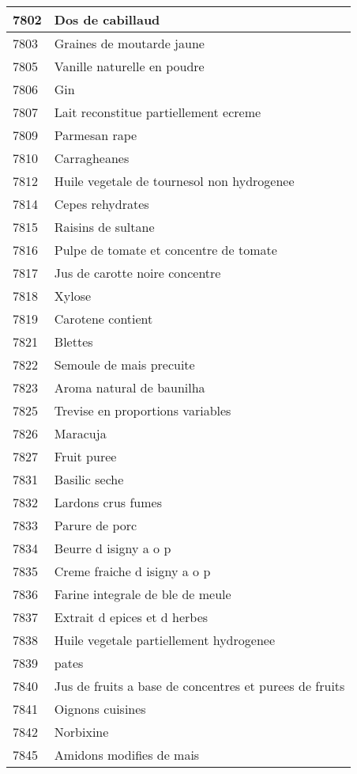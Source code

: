 \begin{longtable}{|l|l|}
7802 & Dos de cabillaud \\ \hline 
7803 & Graines de moutarde jaune \\ \hline 
7805 & Vanille naturelle en poudre \\ \hline 
7806 & Gin \\ \hline 
7807 & Lait reconstitue partiellement ecreme \\ \hline 
7809 & Parmesan rape \\ \hline 
7810 & Carragheanes \\ \hline 
7812 & Huile vegetale de tournesol non hydrogenee \\ \hline 
7814 & Cepes rehydrates \\ \hline 
7815 & Raisins de sultane \\ \hline 
7816 & Pulpe de tomate et concentre de tomate \\ \hline 
7817 & Jus de carotte noire concentre \\ \hline 
7818 & Xylose \\ \hline 
7819 & Carotene contient \\ \hline 
7821 & Blettes \\ \hline 
7822 & Semoule de mais precuite \\ \hline 
7823 & Aroma natural de baunilha \\ \hline 
7825 & Trevise en proportions variables \\ \hline 
7826 & Maracuja \\ \hline 
7827 & Fruit puree \\ \hline 
7831 & Basilic seche \\ \hline 
7832 & Lardons crus fumes \\ \hline 
7833 & Parure de porc \\ \hline 
7834 & Beurre d isigny a o p \\ \hline 
7835 & Creme fraiche d isigny a o p \\ \hline 
7836 & Farine integrale de ble de meule \\ \hline 
7837 & Extrait d epices et d herbes \\ \hline 
7838 & Huile vegetale partiellement hydrogenee \\ \hline 
7839 & pates \\ \hline 
7840 & Jus de fruits a base de concentres et purees de fruits \\ \hline 
7841 & Oignons cuisines \\ \hline 
7842 & Norbixine \\ \hline 
7845 & Amidons modifies de mais \\ \hline 

\end{longtable}
